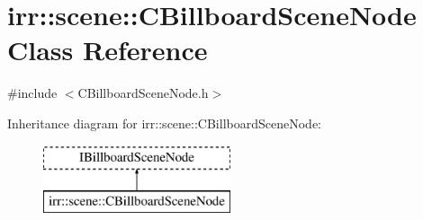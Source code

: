 \hypertarget{classirr_1_1scene_1_1_c_billboard_scene_node}{\section{irr\-:\-:scene\-:\-:C\-Billboard\-Scene\-Node Class Reference}
\label{classirr_1_1scene_1_1_c_billboard_scene_node}
}


{\ttfamily \#include $<$C\-Billboard\-Scene\-Node.\-h$>$}

Inheritance diagram for irr\-:\-:scene\-:\-:C\-Billboard\-Scene\-Node\-:\begin{figure}[H]
\begin{center}
\leavevmode
\includegraphics[height=2.000000cm]{classirr_1_1scene_1_1_c_billboard_scene_node}
\end{center}
\end{figure}
